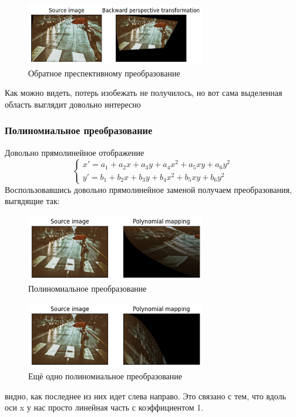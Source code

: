 \documentclass[a4paper,12pt]{article}
\begin{document}
\begin{figure}[H]
    \centering \includegraphics[width=0.7\textwidth]{my_images/33.png}
    \caption{Обратное преспективному преобразование}
\end{figure}
Как можно видеть, потерь изобежать не получилось, но вот сама выделенная область выглядит довольно интересно 
\subsubsection{Полиномиальное преобразование}
Довольно прямолинейное отображение
$$
	\begin{cases}
		x'=a_1+a_2x+a_3y+a_4x^2+a_5xy+a_6y^2 \\
		y'=b_1+b_2x+b_3y+b_4x^2+b_5xy+b_6y^2
	\end{cases}
$$
Воспользовавшись довольно прямолинейное заменой получаем преобразования, выгядящие так:
\begin{figure}[H]
    \centering \includegraphics[width=0.7\textwidth]{my_images/34.png}
    \caption{Полиномиальное преобразование}
\end{figure}
\begin{figure}[H]
    \centering \includegraphics[width=0.7\textwidth]{my_images/35.png}
    \caption{Ещё одно полиномиальное преобразование}
\end{figure}
видно, как последнее из них идет слева направо. Это связано с тем, что вдоль оси x у нас просто линейная часть с коэффициентом 1.
\end{document}
